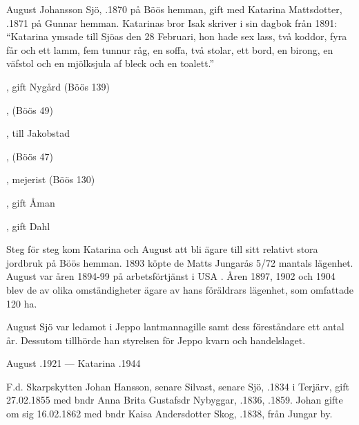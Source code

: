 %
August Johansson Sjö, .1870 på Böös hemman, gift med Katarina Mattsdotter, .1871 på Gunnar hemman. Katarinas bror Isak skriver i sin dagbok från 1891: ``Katarina ymsade till Sjöas den 28 Februari, hon hade sex lass, två koddor, fyra får och ett lamm, fem tunnur råg, en soffa, två stolar, ett bord, en birong, en väfstol och en mjölksjula af bleck och en toalett.''
\begin{jhchildren}
  \item {}, gift Nygård (Böös 139)
  \item {}, (Böös 49)
  \item {}, till Jakobstad
  \item {}
  \item {}, (Böös 47)
  \item {}
  \item {}
  \item {}, mejerist (Böös 130)
  \item {}, gift Åman
  \item {}, gift Dahl
  \item {}
\end{jhchildren}
Steg för steg kom Katarina och August att bli ägare till sitt relativt stora jordbruk på Böös hemman. 1893 köpte de Matts Jungarås 5/72 mantals lägenhet. August var åren 1894-99 på arbetsförtjänst i USA . Åren 1897, 1902 och 1904 blev de av olika omständigheter ägare av hans föräldrars lägenhet, som omfattade 120 ha.

August Sjö var ledamot i Jeppo lantmannagille samt dess föreståndare ett antal år. Dessutom tillhörde han styrelsen för Jeppo kvarn och handelslaget.

August .1921  ---  Katarina .1944


%
F.d. Skarpskytten Johan Hansson, senare Silvast, senare Sjö, .1834 i Terjärv, gift 27.02.1855 med bndr Anna Brita Gustafsdr Nybyggar, .1836, .1859. Johan gifte om sig 16.02.1862 med bndr Kaisa Andersdotter Skog, .1838, från Jungar by.

